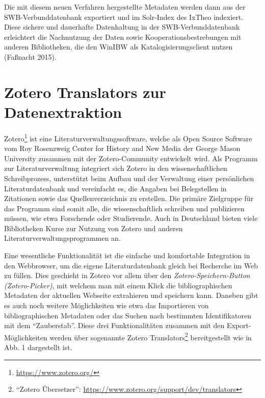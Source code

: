 \documentclass[a4paper,
fontsize=11pt,
oneside,
numbers=noperiodatend,
parskip=half-,
bibliography=totoc,
final
]{scrartcl}
\begin{document}
Die mit diesem neuen Verfahren hergestellte Metadaten werden dann aus
der SWB-Ver\-bund\-daten\-bank exportiert und im Solr-Index des IxTheo
indexiert. Diese sichere und dauerhafte Datenhaltung in der
SWB-Ver\-bund\-daten\-bank erleichtert die Nachnutzung der Daten sowie
Kooperationsbestrebungen mit anderen Bibliotheken, die den WinIBW als
Katalogisierungsclient nutzen (Faßnacht 2015).

\section*{Zotero Translators zur
Datenextraktion}\label{zotero-translators-zur-datenextraktion}

Zotero\footnote{\url{https://www.zotero.org/}} ist eine
Literaturverwaltungssoftware, welche als Open Source Software vom Roy
Rosenzweig Center for History and New Media der George Mason University
zusammen mit der Zotero-Community entwickelt wird. Als Programm zur
Literaturverwaltung integriert sich Zotero in den wissenschaftlichen
Schreibprozess, unterstützt beim Aufbau und der Verwaltung einer
persönlichen Literaturdatenbank und vereinfacht es, die Angaben bei
Belegstellen in Zitationen sowie das Quellenverzeichnis zu erstellen.
Die primäre Zielgruppe für das Programm sind somit alle, die
wissenschaftlich schreiben und publizieren müssen, wie etwa Forschende
oder Studierende. Auch in Deutschland bieten viele Bibliotheken Kurse
zur Nutzung von Zotero und anderen Literaturverwaltungsprogrammen an.

Eine wesentliche Funktionalität ist die einfache und komfortable
Integration in den Webbrowser, um die eigene Literaturdatenbank gleich
bei Recherche im Web zu füllen. Dies geschieht in Zotero vor allem über
den \emph{Zotero-Speichern-Button (Zotero-Picker)}, mit welchem man mit
einem Klick die bibliographischen Metadaten der aktuellen Webseite
extrahieren und speichern kann. Daneben gibt es auch noch weitere
Möglichkeiten wie etwa das Im\-portieren von bibliographischen Metadaten
oder das Suchen nach bestimmten Identifikatoren mit dem
\enquote{Zauberstab}. Diese drei Funktionalitäten zusammen mit den
Export-Möglichkeiten werden über sogenannte Zotero Translators\footnote{\enquote{Zotero
  Übersetzer}: \url{https://www.zotero.org/support/dev/translators}}
bereitgestellt wie in Abb. 1 dargestellt ist.
\end{document}
